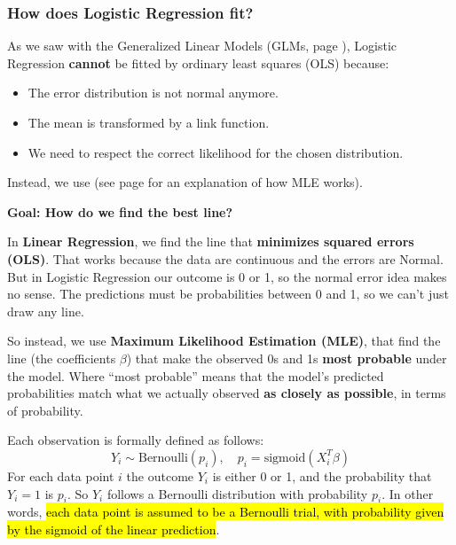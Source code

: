 \subsubsection{How does Logistic Regression fit?}

As we saw with the Generalized Linear Models (GLMs, page \pageref{subsubsection: Fitting GLMs}), Logistic Regression \textbf{cannot} be fitted by ordinary least squares (OLS) because:
\begin{itemize}
    \item The error distribution is not normal anymore.
    \item The mean is transformed by a link function.
    \item We need to respect the correct likelihood for the chosen distribution.
\end{itemize}
Instead, we use  (see page \pageref{subsubsection: Fitting GLMs} for an explanation of how MLE works).

\highspace
\begin{flushleft}
    \textcolor{Green3}{ \textbf{Goal: How do we find the best line?}}
\end{flushleft}
In \textbf{Linear Regression}, we find the line that \textbf{minimizes squared errors (OLS)}. That works because the data are continuous and the errors are Normal. But in Logistic Regression our outcome is 0 or 1, so the normal error idea makes no sense. The predictions must be probabilities between 0 and 1, so we can't just draw any line.

\highspace
So instead, we use \textbf{Maximum Likelihood Estimation (MLE)}, that find the line (the coefficients $\beta$) that make the observed 0s and 1s \textbf{most probable} under the model. Where ``most probable'' means that the model's predicted probabilities match what we actually observed \textbf{as closely as possible}, in terms of probability.

\highspace
Each observation is formally defined as follows:
\begin{equation*}
    Y_i \sim \text{Bernoulli}(p_i), \quad p_i = \text{sigmoid}(X_i^T \beta)
\end{equation*}
For each data point $i$ the outcome $Y_i$ is either 0 or 1, and the probability that $Y_i = 1$ is $p_i$. So $Y_i$ follows a Bernoulli distribution with probability $p_i$. In other words, \hl{each data point is assumed to be a Bernoulli trial, with probability given by the sigmoid of the linear prediction}.

